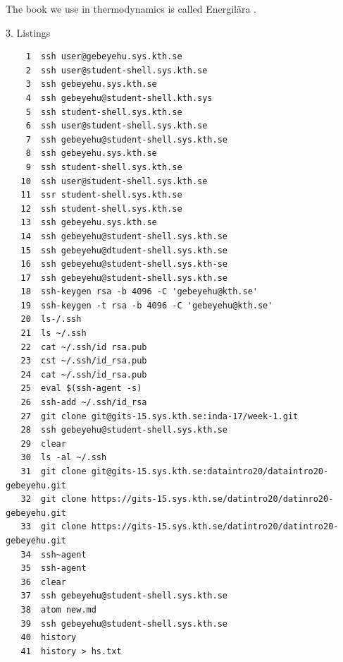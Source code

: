 \documentclass{article}
\begin{document}
\vspace{10mm}
{\LARGE The book we use in thermodynamics is called Energilära \autocite{Beckman2005egt}.}

\vspace{30mm}

{\Huge 3. Listings}

\begin{lstlisting}
    1  ssh user@gebeyehu.sys.kth.se
    2  ssh user@student-shell.sys.kth.se
    3  ssh gebeyehu.sys.kth.se
    4  ssh gebeyehu@student-shell.kth.sys
    5  ssh student-shell.sys.kth.se
    6  ssh user@student-shell.sys.kth.se
    7  ssh gebeyehu@student-shell.sys.kth.se
    8  ssh gebeyehu.sys.kth.se
    9  ssh student-shell.sys.kth.se
   10  ssh user@student-shell.sys.kth.se
   11  ssr student-shell.sys.kth.se
   12  ssh student-shell.sys.kth.se
   13  ssh gebeyehu.sys.kth.se
   14  ssh gebeyehu@student-shell.sys.kth.se
   15  ssh gebeyehu@dtudent-shell.sys.kth.se
   16  ssh gebeyehu@student-shell.sys.kth-se
   17  ssh gebeyehu@student-shell.sys.kth.se
   18  ssh-keygen rsa -b 4096 -C 'gebeyehu@kth.se'
   19  ssh-keygen -t rsa -b 4096 -C 'gebeyehu@kth.se'
   20  ls-/.ssh
   21  ls ~/.ssh
   22  cat ~/.ssh/id rsa.pub
   23  cst ~/.ssh/id_rsa.pub
   24  cat ~/.ssh/id_rsa.pub
   25  eval $(ssh-agent -s)
   26  ssh-add ~/.ssh/id_rsa
   27  git clone git@gits-15.sys.kth.se:inda-17/week-1.git
   28  ssh gebeyehu@student-shell.sys.kth.se
   29  clear
   30  ls -al ~/.ssh
   31  git clone git@gits-15.sys.kth.se:dataintro20/dataintro20-gebeyehu.git
   32  git clone https://gits-15.sys.kth.se/datintro20/datinro20-gebeyehu.git
   33  git clone https://gits-15.sys.kth.se/datintro20/datintro20-gebeyehu.git
   34  ssh~agent
   35  ssh-agent
   36  clear
   37  ssh gebeyehu@student-shell.sys.kth.se
   38  atom new.md
   39  ssh gebeyehu@student-shell.sys.kth.se
   40  history
   41  history > hs.txt
\end{lstlisting}
\vspace{90mm}

\printbibliography
\end{document}
